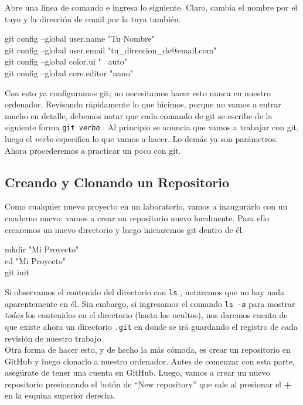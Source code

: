 \documentclass[10pt,letterpaper]{article}
\newcommand{\inlinecode}[1]{
\colorbox{light-gray}{\texttt{#1}}
}
\newenvironment{Code}
{
\begin{lrbox}{\selvestebox}%
\begin{minipage}{\dimexpr\columnwidth-2\fboxsep\relax}
\fontfamily{\ttdefault}\selectfont
}
{\end{minipage}\end{lrbox}%
\begin{center}
\colorbox{light-gray}{\usebox{\selvestebox}}
\end{center}
}
\begin{document}
Abre una l\'inea de comando e ingresa lo siguiente. Claro, cambia el nombre por el tuyo y la direcci\'on de email por la tuya tambi\'en.

\begin{Code}
git config --global user.name "Tu Nombre"\\
git config --global user.email "tu\_direccion\_de@email.com"\\
git config --global color.ui "\ \hspace*{-1em} auto"\\
git config --global core.editor "nano"
\end{Code}

Con esto ya configuramos git; no necesitamos hacer esto nunca en nuestro ordenador. Revisando r\'apidamente lo que hicimos, porque no vamos a entrar mucho en detalle, debemos notar que cada comando de git se escribe de la siguiente forma \inlinecode{git \emph{verbo}}. Al principio se anuncia que vamos a trabajar con git, luego el \emph{verbo} especifica lo que vamos a hacer. Lo dem\'as ya son par\'ametros. Ahora procederemos a practicar un poco con git.
\pagebreak
\subsection{Creando y Clonando un Repositorio}
Como cualquier nuevo proyecto en un laboratorio, vamos a inaugurarlo con un cuaderno nuevo: vamos a crear un repositorio nuevo localmente. Para ello crearemos un nuevo directorio y luego iniciaremos git dentro de \'el.

\begin{Code}
mkdir "Mi Proyecto"\\
cd "Mi Proyecto"\\
git init
\end{Code}

Si observamos el contenido del directorio con \inlinecode{ls}, notaremos que no hay nada aparentemente en \'el. Sin embargo, si ingresamos el comando \inlinecode{ls -a} para mostrar \emph{todos} los contenidos en el directorio (hasta los ocultos), nos daremos cuenta de que existe ahora un directorio \inlinecode{.git} en donde se ir\'a guardando el registro de cada revisi\'on de nuestro trabajo.\\

Otra forma de hacer esto, y de hecho la m\'as c\'omoda, es crear un repositorio en GitHub y luego clonarlo a nuestro ordenador. Antes de comenzar con esta parte, aseg\'urate de tener una cuenta en GitHub. Luego, vamos a crear un nuevo repositorio presionando el bot\'on de ``New repository'' que sale al presionar el \textbf{+} en la esquina superior derecha.\\
\end{document}
